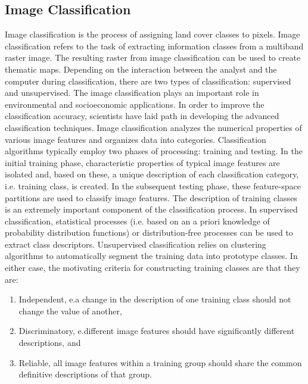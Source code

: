 \subsection{Image Classification}\label{s:patt-class}
Image classification is the process of assigning land cover classes to pixels. Image classification refers to the task of extracting information classes from a multiband raster image. The resulting raster from image classification can be used to create thematic maps. Depending on the interaction between the analyst and the computer during classification, there are two types of classification: supervised and unsupervised. The image classification plays an important role in environmental and socioeconomic applications. In order to improve the classification accuracy, scientists have laid path in developing the advanced classification techniques.
Image classification analyzes the numerical properties of various image features and organizes data into categories. Classification algorithms typically employ two phases of processing: training and testing. In the initial training phase, characteristic properties of typical image features are isolated and, based on these, a unique description of each classification category, i.e. training class, is created. In the subsequent testing phase, these feature-space partitions are used to classify image features. The description of training classes is an extremely important component of the classification process. In supervised classification, statistical processes (i.e. based on an a priori knowledge of probability distribution functions) or distribution-free processes can be used to extract class descriptors. Unsupervised classification relies on clustering algorithms to automatically segment the training data into prototype classes. In either case, the motivating criteria for constructing training classes are that they are:
\begin{enumerate}
	\item Independent, e.a change in the description of one training class should not change the value of another,
	\item Discriminatory, e.different image features should have significantly different descriptions, and
	\item Reliable, all image features within a training group should share the common definitive descriptions of that group.
\end{enumerate}


